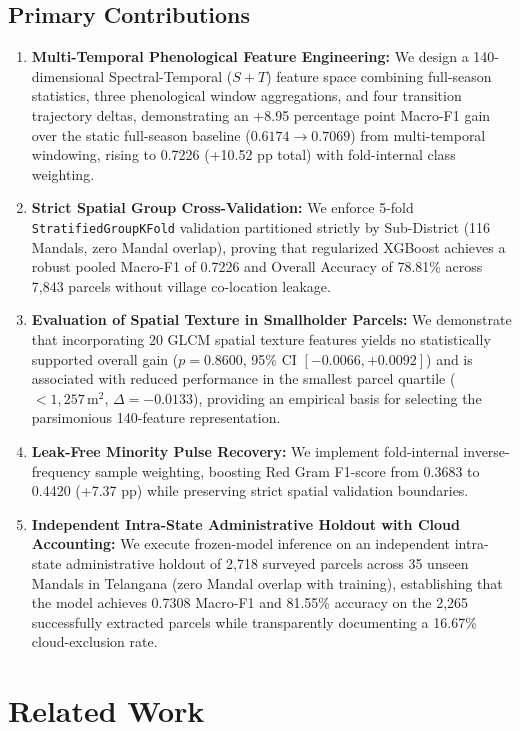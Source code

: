 \documentclass[runningheads]{llncs}
\begin{document}
\subsection{Primary Contributions}
\begin{enumerate}
    \item \textbf{Multi-Temporal Phenological Feature Engineering:} We design a 140-dimensional Spectral-Temporal ($S+T$) feature space combining full-season statistics, three phenological window aggregations, and four transition trajectory deltas, demonstrating an +8.95 percentage point Macro-F1 gain over the static full-season baseline ($0.6174 \to 0.7069$) from multi-temporal windowing, rising to 0.7226 (+10.52 pp total) with fold-internal class weighting.
    \item \textbf{Strict Spatial Group Cross-Validation:} We enforce 5-fold \texttt{StratifiedGroupKFold} validation partitioned strictly by Sub-District (116 Mandals, zero Mandal overlap), proving that regularized XGBoost achieves a robust pooled Macro-F1 of 0.7226 and Overall Accuracy of 78.81\% across 7,843 parcels without village co-location leakage.
    \item \textbf{Evaluation of Spatial Texture in Smallholder Parcels:} We demonstrate that incorporating 20 GLCM spatial texture features yields no statistically supported overall gain ($p = 0.8600$, 95\% CI $[-0.0066, +0.0092]$) and is associated with reduced performance in the smallest parcel quartile ($<1{,}257\,\text{m}^2$, $\Delta = -0.0133$), providing an empirical basis for selecting the parsimonious 140-feature representation.
    \item \textbf{Leak-Free Minority Pulse Recovery:} We implement fold-internal inverse-frequency sample weighting, boosting Red Gram F1-score from 0.3683 to 0.4420 (+7.37 pp) while preserving strict spatial validation boundaries.
    \item \textbf{Independent Intra-State Administrative Holdout with Cloud Accounting:} We execute frozen-model inference on an independent intra-state administrative holdout of 2,718 surveyed parcels across 35 unseen Mandals in Telangana (zero Mandal overlap with training), establishing that the model achieves 0.7308 Macro-F1 and 81.55\% accuracy on the 2,265 successfully extracted parcels while transparently documenting a 16.67\% cloud-exclusion rate.
\end{enumerate}

\section{Related Work}
\end{document}
